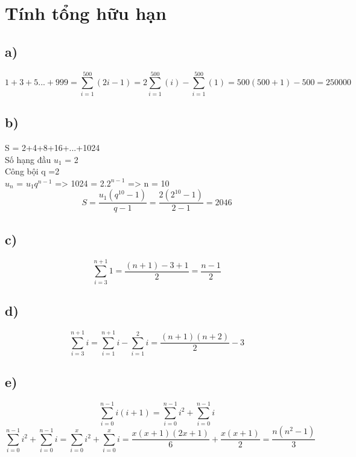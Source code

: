 \documentclass[10pt,a4paper]{article}
\begin{document}
\section{Tính tổng hữu hạn}
\subsection*{a)} %
        \begin{equation*}
            1+3+5...+999 = \sum_{i=1}^{500}{(2i-1)}=2\sum_{i=1}^{500}{(i)}-\sum_{i=1}^{500}{(1)}=500(500+1)-500=250000
        \end{equation*}
\subsection*{b)} %
    S = 2+4+8+16+...+1024 \\
    Số hạng đầu $u_1$ = 2 \\
    Công bội q =2 \\
        $u_{n}$ = $u_{1}q^{n-1}$
    => 1024 = 2.$2^{n-1}$ => n = 10 
    \begin{equation*}
        S = \frac{u_{1}(q^{10}-1)}{q-1} = \frac{2(2^{10}-1)}{2-1} = 2046
    \end{equation*}
\subsection*{c)} %
    \begin{equation*}
        \sum_{i=3}^{n+1}{1} = \frac{(n+1)-3+1}{2} = \frac{n-1}{2}
    \end{equation*}
\subsection*{d)} %
        \begin{equation*}
            \sum_{i=3}^{n+1}{i} = \sum_{i=1}^{n+1}{i}-\sum_{i=1}^{2}{i}=\frac{(n+1)(n+2)}{2}-3
        \end{equation*}
\subsection*{e)} %
    \begin{equation*}
        \sum_{i=0}^{n-1}{i(i+1)} = \sum_{i=0}^{n-1}{i^2}+\sum_{i=0}^{n-1}{i} 
    \end{equation*}
    \begin{equation*}
        \sum_{i=0}^{n-1}{i^2}+\sum_{i=0}^{n-1}{i} = \sum_{i=0}^{x}{i^2}+\sum_{i=0}^{x}{i} = \frac{x(x+1)(2x+1)}{6}+\frac{x(x+1)}{2} = \frac{n(n^2-1)}{3}
    \end{equation*}
\end{document}

